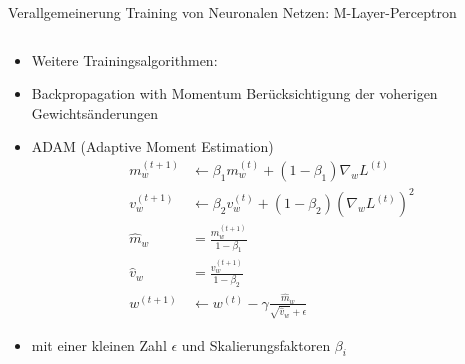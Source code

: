 \documentclass[aspectratio=1610, xcolor=dvipsnames, 9pt]{beamer}
\begin{document}
      \begin{frame}{ Verallgemeinerung Training von Neuronalen Netzen: M-Layer-Perceptron}
        \begin{columns}
          \begin{column}{1\textwidth}
            \begin{itemize}
              \item Weitere Trainingsalgorithmen:
              \item Backpropagation with Momentum \rightarrow Berücksichtigung der voherigen Gewichtsänderungen
              \item ADAM (Adaptive Moment Estimation)
              \begin{align*}
                m_w ^ {(t+1)} &\leftarrow \beta_1 m_w ^ {(t)} + (1 - \beta_1) \nabla _w L ^ {(t)}\\
                v_w ^ {(t+1)} &\leftarrow \beta_2 v_w ^ {(t)} + (1 - \beta_2) (\nabla _w L ^ {(t)} )^2\\
                \hat{m}_w &= \frac{m_w ^ {(t+1)}}{1 - \beta_1}\\
                \hat{v}_w &= \frac{ v_w ^ {(t+1)}}{1 - \beta_2}\\         
                w ^ {(t+1)} &\leftarrow w ^ {(t)} - \gamma \frac{\hat{m}_w}{\sqrt{\hat{v}_w} + \epsilon}
              \end{align*}
              \item mit einer kleinen Zahl $\epsilon$ und Skalierungsfaktoren $\beta_i$
            \end{itemize}
          \end{column}
        \end{columns}
      \end{frame}
\end{document}
